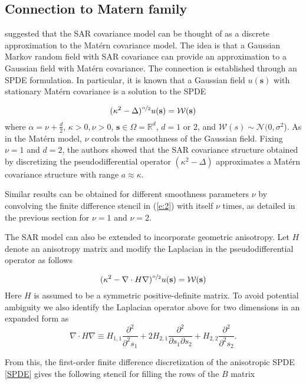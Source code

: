 \documentclass[review]{elsarticle}
\begin{document}
\subsection{Connection to Matern family}


\citet{lindgren2011explicit} suggested that the SAR covariance model can be thought of as a discrete approximation to the Mat\'ern covariance model. The idea is that a Gaussian Markov random field with SAR covariance can provide an approximation to a Gaussian field with Mat\'ern covariance. The connection is established through an SPDE formulation. In particular, it is known that a Gaussian field $u(\mathbf s)$ with stationary Mat\'ern covariance is a solution to the SPDE

$$ (\kappa^2 - \Delta)^{\nicefrac{\alpha}{2}} u(\mathbf s) = \mathcal{W}(\mathbf s) $$
where $\alpha = \nu + \frac{d}{2}$, $\kappa > 0, \nu > 0$, $\mathbf s \in \Omega = \mathbb{R}^d$, $d = 1$ or $2$, and $\mathcal{W}(s) \sim \mathcal{N}(0, \sigma^2$). As in the Mat\'ern model, $\nu$ controls the smoothness of the Gaussian field. Fixing $\nu = 1$ and $d = 2$, the authors showed that the SAR covariance structure obtained by discretizing the pseudodifferential operator $(\kappa^2 - \Delta)$ approximates a Mat\'ern covariance structure with range $a \approx \kappa$. 

Similar results can be obtained for different smoothness parameters $\nu$ by convolving the finite difference stencil in (\ref{e:2}) with itself $\nu$ times, as detailed in the previous section for $\nu=1$ and $\nu=2$.

 The SAR model can also be extended to incorporate geometric anisotropy. Let $H$  denote an anisotropy matrix and modify the  Laplacian in the pseudodifferential operator as follows

\begin{equation}
\label{SPDE}
 (\kappa^2 - \nabla \cdot H \nabla)^{\nicefrac{\alpha}{2}} u(\mathbf s) = \mathcal{W}(\mathbf s) 
 \end{equation} 
Here $H$ is assumed to be a symmetric positive-definite matrix.
 To avoid potential ambiguity we also identify  the Laplacian  operator above for two dimensions  in an expanded form as 
\[  \nabla \cdot H \nabla  \equiv  H_{1,1} \frac{\partial^2}{\partial^2 s_1} +  2 H_{2,1} \frac{\partial^2}{\partial s_1 \partial s_2} + H_{2,2} \frac{\partial^2}{\partial^2 s_2}. \]

From this, the first-order finite difference discretization of the anisotropic SPDE \ref{SPDE} gives the following stencil for filling the rows of the $B$ matrix
\end{document}
